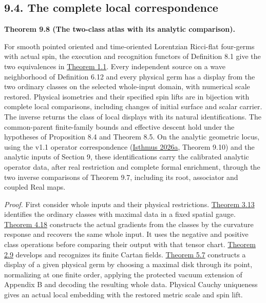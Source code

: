 \documentclass[
  english,
  11pt,
  reqno]{amsart}
\makeatletter
\newcommand{\paperdisplaynext}{%
  \let\paper@savedstartsection\@startsection
  \def\@startsection##1##2##3##4##5##6{%
    \let\@startsection\paper@savedstartsection
    \@tempskipa ##5\relax
    \ifdim\@tempskipa<\z@
      \def\paper@afterskip{.35\baselineskip}%
    \else
      \def\paper@afterskip{##5}%
    \fi
    \@startsection{##1}{##2}{##3}{##4}{\paper@afterskip}{##6}}}
\newcommand{\paperdisplaysection}{\paperdisplaynext\subsection}
\newcommand{\pandocstatementheading}[1]{%
  \par\if@nobreak\else
    \addpenalty{\@beginparpenalty}%
    \addvspace{.5\baselineskip plus .2\baselineskip minus .2\baselineskip}%
  \fi
  {\normalfont\bfseries #1\par}%
  \nobreak\@afterindenttrue\@afterheading
}
\let\paper@displaysection\paperdisplaysection
\renewcommand{\paperdisplaysection}[1]{%
  \let\paper@savedhangfrom\@hangfrom
  \long\def\@hangfrom##1##2{%
    \paper@savedhangfrom{##1}{\paper@headingparagraph##2}}%
  \paper@displaysection{#1}%
  \let\@hangfrom\paper@savedhangfrom}
\makeatother
\begin{document}
\paperdisplaysection{9.4. The complete local
correspondence}\label{the-complete-local-correspondence}\label{sec:analytic-correspondence-assembly}

\pandocstatementheading{\leavevmode{}\label{thm:combined-local-atlas}Theorem 9.8 (The two-class atlas with its analytic comparison).}

For smooth pointed oriented and time-oriented Lorentzian Ricci-flat
four-germs with actual spin, the execution and recognition functors of
Definition 8.1 give the two equivalences in
\hyperref[thm:local-main-correspondence]{Theorem 1.1}. Every independent
source on a wave neighborhood of Definition 6.12 and every physical germ
has a display from the two ordinary classes on the selected whole-input
domain, with numerical scale restored. Physical isometries and their
specified spin lifts are in bijection with complete local comparisons,
including changes of initial surface and scalar carrier. The inverse
returns the class of local displays with its natural identifications.
The common-parent finite-family bounds and effective descent hold under
the hypotheses of Proposition 8.4 and Theorem 8.5. On the analytic
geometric locus, using the v1.1 operator correspondence
(\hyperref[ref-IsthmusLocal2026]{Isthmus 2026a}, Theorem 9.10) and the
analytic inputs of Section 9, these identifications carry the calibrated
analytic operator data, after real restriction and complete formal
enrichment, through the two inverse comparisons of Theorem 9.7,
including its root, associator and coupled Real maps.

\emph{Proof.} First consider whole inputs and their physical
restrictions. \hyperref[thm:online-ordinary-pair-data-bijection]{Theorem
3.13} identifies the ordinary classes with maximal data in a fixed
spatial gauge.
\hyperref[thm:online-ordinary-negative-response-initial-source]{Theorem
4.18} constructs the actual gradients from the classes by the curvature
response and recovers the same whole input. It uses the negative and
positive class operations before comparing their output with that tensor
chart. \hyperref[thm:online-cartan-collar-recognition]{Theorem 2.9}
develops and recognizes its finite Cartan fields.
\hyperref[thm:submission-vacuum-germ-coverage]{Theorem 5.7} constructs a
display of a given physical germ by choosing a maximal disk through its
point, normalizing at one finite order, applying the protected vacuum
extension of Appendix B and decoding the resulting whole data. Physical
Cauchy uniqueness gives an actual local embedding with the restored
metric scale and spin lift.
\end{document}
